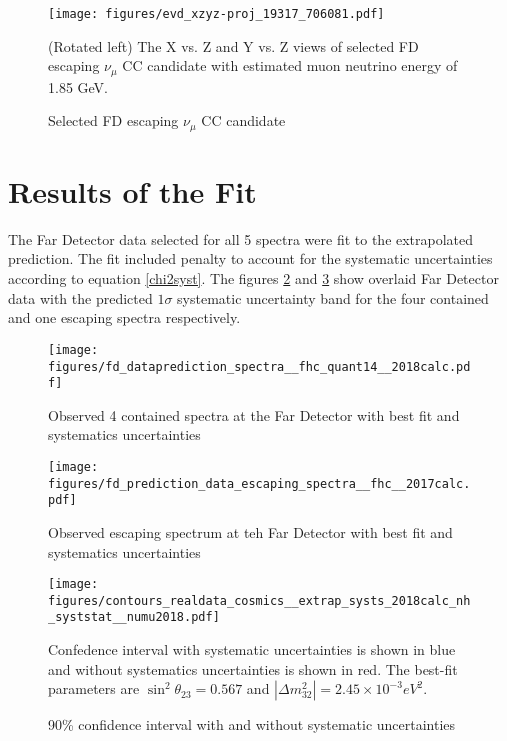 \clearpage
\begin{figure}[!th]
\centering
\texttt{[image: figures/evd\_xzyz-proj\_19317\_706081.pdf]}
\caption{Selected FD escaping $\nu_\mu$ CC candidate}
{(Rotated left) The X vs. Z and Y vs. Z views of selected FD escaping $\nu_\mu$ CC candidate with estimated muon
neutrino energy of 1.85 GeV.}
\label{fig:candidate3}
\end{figure}

\clearpage
\section{Results of the Fit}
The Far Detector data selected for all 5 spectra were fit to the extrapolated prediction. The fit included penalty to 
account for the systematic uncertainties according to equation \ref{chi2syst}. The figures \ref{fig:dataprediction_cont}
and \ref{fig:dataprediction_uncont} show overlaid Far Detector data with the predicted $1\sigma$ systematic uncertainty band
for the four contained and one escaping spectra respectively.  

\begin{figure}[!th]
\centering
\texttt{[image: figures/fd\_dataprediction\_spectra\_\_fhc\_quant14\_\_2018calc.pdf]}
\caption{Observed 4 contained spectra at the Far Detector with best fit and systematics uncertainties}
{}
\label{fig:dataprediction_cont}
\end{figure}

\begin{figure}[!th]
\centering
\texttt{[image: figures/fd\_prediction\_data\_escaping\_spectra\_\_fhc\_\_2017calc.pdf]}
\caption{Observed escaping spectrum at teh Far Detector with best fit and systematics uncertainties}
{}
\label{fig:dataprediction_uncont}
\end{figure}

\begin{figure}[!th]
\centering
\texttt{[image: figures/contours\_realdata\_cosmics\_\_extrap\_systs\_2018calc\_nh\_syststat\_\_numu2018.pdf]}
\caption{90\% confidence interval with and without systematic uncertainties}
{Confedence interval with systematic uncertainties is shown in blue and without systematics uncertainties is shown in red. 
The best-fit parameters are $\sin^2\theta_{23} = 0.567$ and $|\Delta m^2_{32}| = 2.45\times 10^{-3} eV^2$.}
\label{fig:cant_w_wo_syst}
\end{figure}

